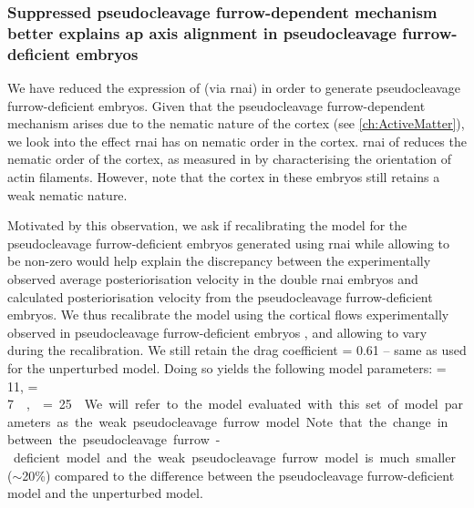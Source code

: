 \subsubsection{Suppressed pseudocleavage furrow-dependent mechanism better explains \acs{ap} axis alignment in pseudocleavage furrow-deficient embryos}\label{subsubsec:reducedPcModelForNop1Mel11}
We have reduced the expression of  (via \ac{rnai}) in order to generate pseudocleavage furrow-deficient embryos. Given that the pseudocleavage furrow-dependent mechanism arises due to the nematic nature of the cortex (see \autoref{ch:ActiveMatter}), we look into the effect  \ac{rnai} has on nematic order in the cortex. \ac{rnai} of  reduces the nematic order of the cortex, as measured in \cite{reymann2016cortical} by characterising the orientation of actin filaments. However, note that the cortex in these embryos still retains a weak nematic nature.

Motivated by this observation, we ask if recalibrating the model for the pseudocleavage furrow-deficient embryos generated using  \ac{rnai} while allowing \nematicLength to be non-zero would help explain the discrepancy between the experimentally observed average posteriorisation velocity in the double \ac{rnai} embryos and calculated posteriorisation velocity from the pseudocleavage furrow-deficient embryos. We thus recalibrate the model using the cortical flows experimentally observed in pseudocleavage furrow-deficient embryos , and allowing \nematicLength to vary during the recalibration. We still retain the drag coefficient \dragCoefficient = \num{0.61} -- same as used for the unperturbed model. Doing so yields the following model parameters: \hydrodynamicLength = \SI{11}{\unitLength}, \activeRelaxLength = \SI{7}{\square\unitLength\per\second}, \nematicLength = \SI{25}{\square\unitLength\per\second}. We will refer to the model evaluated with this set of model parameters as the weak pseudocleavage furrow model. Note that the change in \nematicLength between the pseudocleavage furrow-deficient model and the weak pseudocleavage furrow model is much smaller ($\sim$\num{20}\%) compared to the difference between the pseudocleavage furrow-deficient model and the unperturbed model. 


